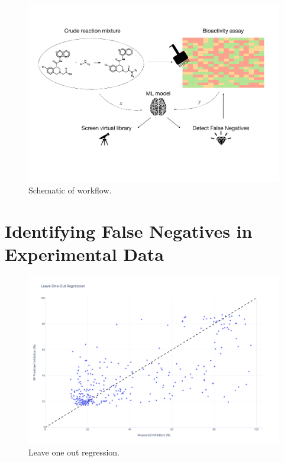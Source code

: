 \begin{figure}
    \centering
             \includegraphics[width=\textwidth]{Chapters/Crude/Figs/schematic.pdf}
        \caption{Schematic of workflow.}
        \label{fig:schematic}
    \end{figure}

\section{Identifying False Negatives in Experimental Data}

\begin{figure}
    \centering
             \includegraphics[width=\textwidth]{Chapters/Crude/Figs/rf.pdf}
        \caption{Leave one out regression.}
        \label{fig:leave-one-out}
    \end{figure}

